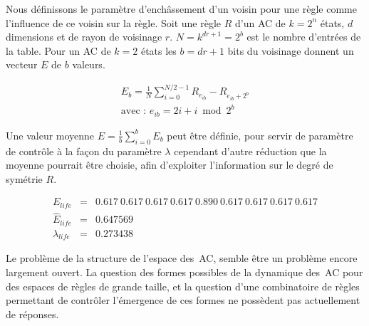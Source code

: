Nous définissons le paramètre d'enchâssement d'un voisin pour une
règle comme l'influence de ce voisin sur la règle. %
Soit une règle $R$ d'un AC de $k = 2^n$ états, $d$ dimensions et de
rayon de voisinage $r$. %
$N = k^{dr+1} = 2^b$ est le nombre d'entrées de la table. %
Pour un AC de $k = 2$ états les $b = dr+1$ bits du voisinage donnent
un vecteur $E$ de $b$ valeurs.

\begin{eqnarray}
\label{rs-eq1}
        E_{b} = \frac{1}{N} \sum_{i = 0}^{N/2 - 1} R_{e_{ib}} - R_{e_{ib} + 2^b} \\
        \mbox{avec : } e_{ib} = 2i + i \bmod 2^b \nonumber
\end{eqnarray}

Une valeur moyenne $E = \frac{1}{b} \sum_{i = 0}^{b} E_b$ peut être
définie, pour servir de paramètre de contrôle à la façon du
paramètre $\lambda$ cependant d'autre réduction que la moyenne
pourrait être choisie, afin d'exploiter l'information sur le degré de
symétrie $R$.

\begin{eqnarray}
        E_{life} & = &
        {0.617\ 0.617\ 0.617\ 0.617\ 0.890\ 0.617\ 0.617\ 0.617\ 0.617} \nonumber \\
        \hat{E}_{life} & = & 0.647569 \nonumber \\
        \lambda_{life} & = & 0.273438 \nonumber
\end{eqnarray}

Le problème de la structure de l'espace des~AC, semble être un
problème encore largement ouvert. %
La question des formes possibles de la dynamique des~AC pour des
espaces de règles de grande taille, et la question d'une combinatoire
de règles permettant de contrôler l'émergence de ces formes ne
possèdent pas actuellement de réponses.

